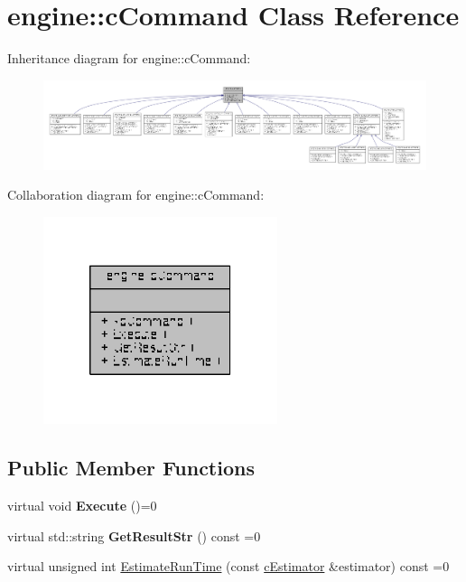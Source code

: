 \hypertarget{classengine_1_1cCommand}{\section{engine\-:\-:c\-Command Class Reference}
\label{classengine_1_1cCommand}
}


Inheritance diagram for engine\-:\-:c\-Command\-:
\nopagebreak
\begin{figure}[H]
\begin{center}
\leavevmode
\includegraphics[width=350pt]{classengine_1_1cCommand__inherit__graph}
\end{center}
\end{figure}


Collaboration diagram for engine\-:\-:c\-Command\-:
\nopagebreak
\begin{figure}[H]
\begin{center}
\leavevmode
\includegraphics[width=194pt]{classengine_1_1cCommand__coll__graph}
\end{center}
\end{figure}
\subsection*{Public Member Functions}
\begin{DoxyCompactItemize}
\item 
\hypertarget{classengine_1_1cCommand_a4c84c161b94f6ae36aec3661f951b54f}{virtual void {\bfseries Execute} ()=0}\label{classengine_1_1cCommand_a4c84c161b94f6ae36aec3661f951b54f}

\item 
\hypertarget{classengine_1_1cCommand_a45c4fb197d53901d511c4db8a6ae1a3a}{virtual std\-::string {\bfseries Get\-Result\-Str} () const =0}\label{classengine_1_1cCommand_a45c4fb197d53901d511c4db8a6ae1a3a}

\item 
virtual unsigned int \hyperlink{classengine_1_1cCommand_a8b5b45ad34530c454722a44e41ce9e78}{Estimate\-Run\-Time} (const \hyperlink{classengine_1_1cEstimator}{c\-Estimator} \&estimator) const =0
\end{DoxyCompactItemize}


